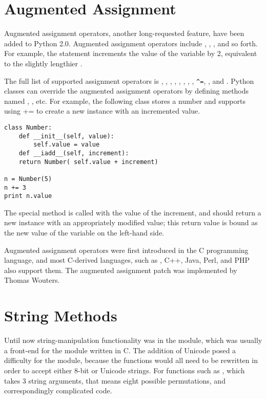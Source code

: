 \documentclass{howto}
\begin{document}
\section{Augmented Assignment}

Augmented assignment operators, another long-requested feature, have
been added to Python 2.0.  Augmented assignment operators include
\code{+=}, \code{-=}, \code{*=}, and so forth.  For example, the
statement  increments the value of the variable 
 by 2, equivalent to the slightly lengthier .

The full list of supported assignment operators is \code{+=},
\code{-=}, \code{*=}, \code{/=}, \code{\%=}, \code{**=}, \code{\&=},
\code{|=}, \verb|^=|, \code{>>=}, and \code{<<=}.  Python classes can
override the augmented assignment operators by defining methods named
, , etc.  For example, the following
 class stores a number and supports using += to create a
new instance with an incremented value.

\begin{verbatim}
class Number:
    def __init__(self, value):
        self.value = value
    def __iadd__(self, increment):
	return Number( self.value + increment)

n = Number(5)
n += 3
print n.value
\end{verbatim}

The  special method is called with the value of the
increment, and should return a new instance with an appropriately
modified value; this return value is bound as the new value of the
variable on the left-hand side. 

Augmented assignment operators were first introduced in the C
programming language, and most C-derived languages, such as
, C++, Java, Perl, and PHP also support them.  The augmented
assignment patch was implemented by Thomas Wouters.

\section{String Methods}

Until now string-manipulation functionality was in the 
module, which was usually a front-end for the 
module written in C.  The addition of Unicode posed a difficulty for
the  module, because the functions would all need to be
rewritten in order to accept either 8-bit or Unicode strings.  For
functions such as , which takes 3 string
arguments, that means eight possible permutations, and correspondingly
complicated code.
\end{document}
